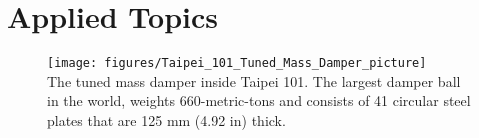 \documentclass[12pt,letter]{article}
\begin{document}








\part{Applied Topics}

\begin{figure}[H]
	\centering
	\texttt{[image: figures/Taipei\_101\_Tuned\_Mass\_Damper\_picture]} \\
	The tuned mass damper inside Taipei 101.  The largest damper ball in the world, weights 660-metric-tons and consists of 41 circular steel plates that are 125 mm (4.92 in) thick.  \protect\footnotemark[1]
\end{figure}

















%


\pagebreak
\renewcommand{\thepage}{}
\renewcommand\refname{References Cited}
\pagestyle{plain}


\end{document}
